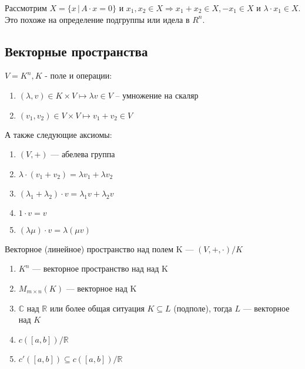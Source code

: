\begin{remark} 
    Рассмотрим $X = \{ x \, | \, A \cdot x = 0 \}$ и $x_1, x_2 \in X \Longrightarrow x_1 + x_2 \in X, -x_1 \in X $ и $\lambda \cdot x_1 \in X$. Это похоже на определение подгруппы или идела в $R^n$.
\end{remark}

\newpage
\subsection{Векторные пространства}

\begin{definition}
    
    \quad $V = K^n, K$ - поле и операции:
    \begin{enumerate}
        \item $ (\lambda, v) \in K \times V \mapsto \lambda v \in V$ -- умножение на скаляр
        \item $(v_1, v_2) \in V \times V \mapsto v_1 + v_2 \in V$
    \end{enumerate} 
    \quad А также следующие аксиомы:
    \begin{enumerate}
        \item $(V, +)$ --- абелева группа
        \item $\lambda \cdot (v_1 + v_2) = \lambda v_1 + \lambda v_2$
        \item $(\lambda_1 + \lambda_2) \cdot v = \lambda_1 v + \lambda_2 v$
        \item $1 \cdot v = v$
        \item $(\lambda \mu)\cdot v = \lambda (\mu v)$
    \end{enumerate}
\quad Векторное (линейное) пространство над полем K --- $(V, +, \cdot) / K$
\end{definition}

\quad 

\begin{examples}
    \begin{enumerate}
        \item $K^n$ --- векторное пространство над над K 
        \item $M_{m \times n}(K)$ --- векторное над K
        \item $\mathbb{C}$ над $\mathbb{R}$ или более общая ситуация $K \subseteq L$ (подполе), тогда  $L$ --- векторное над $K$
        \item $c([a,b]) / \mathbb{R}$
        \item $c'([a,b]) \subseteq c([a,b]) / \mathbb{R}$
    \end{enumerate}
    
\end{examples}

